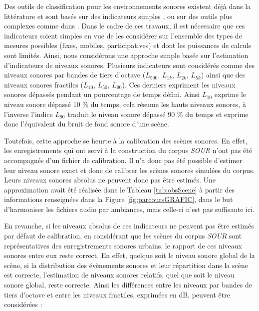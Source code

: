 Des outils de classification pour les environnements sonores existent déjà dans la littérature et sont basés sur des indicateurs simples \cite{can_describing_2015}, \cite{rychtarikova2013soundscape} ou sur des outils plus complexes comme dans \cite{salamon2015unsupervised}.
Dans le cadre de ces travaux, il est nécessaire que ces indicateurs soient simples en vue de les considérer sur l'ensemble des types de mesures possibles (fixes, mobiles, participatives) et dont les puissances de calculs sont limités. Ainsi, nous considérons une approche simple basée sur l'estimation d'indicateurs de niveaux sonores.
Plusieurs indicateurs sont considérés comme des niveaux sonores par bandes de tiers d'octave ($L_{500}$, $L_{1k}$, $L_{2k}$, $L_{5k}$) ainsi que des niveaux sonores fractiles ($L_{10}$, $L_{50}$, $L_{90}$). Ces derniers expriment les niveaux sonores dépassés pendant un pourcentage de temps défini. Ainsi $L_{10}$ exprime le niveau sonore dépassé 10 $\%$ du temps, cela résume les hauts niveaux sonores, à l'inverse l'indice $L_{90}$ traduit le niveau sonore dépassé 90 $\%$ du temps et exprime donc l'équivalent du bruit de fond sonore d'une scène.

Toutefois, cette approche se heurte à la calibration des scènes sonores. En effet, les enregistrements qui ont servi à la construction du corpus \textit{SOUR} n'ont pas été accompagnés d'un fichier de calibration. Il n'a donc pas été possible d'estimer leur niveau sonore exact et donc de calibrer les scènes sonores simulées du corpus. Leurs niveaux sonores absolus ne peuvent donc pas être estimés. Une approximation avait été réalisée dans le Tableau \ref{tab:obsScene} à partir des informations renseignées dans la Figure \ref{fig:parcoursGRAFIC}, dans le but d'harmoniser les fichiers audio par ambiances, mais celle-ci n'est pas suffisante ici.

En revanche, si les niveaux absolus de ces indicateurs ne peuvent pas être estimés par défaut de calibration, en considérant que les scènes du corpus \textit{SOUR} sont représentatives des enregistrements sonores urbains, le rapport de ces niveaux sonores entre eux reste correct. En effet, quelque soit le niveau sonore global de la scène, si la distribution des évènements sonores et leur répartition dans la scène est correcte, l'estimation de niveaux sonores relatifs, quel que soit le niveau sonore global, reste correcte.
Ainsi les différences entre les niveaux par bandes de tiers d'octave et entre les niveaux fractiles, exprimées en dB, peuvent être considérées : 

